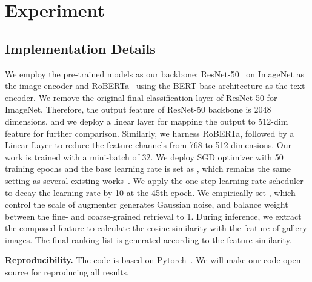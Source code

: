 \documentclass[10pt,twocolumn,letterpaper]{article}
\begin{document}
\section{Experiment}
\subsection{Implementation Details}   
We employ the pre-trained models as our backbone: ResNet-50~\cite{He2015resnet} on ImageNet as the image encoder and RoBERTa~\cite{liu2019roberta} using the BERT-base architecture as the text encoder. 
We remove the original final classification layer of ResNet-50 for ImageNet. Therefore, the output feature of ResNet-50 backbone is 2048 dimensions, and we deploy a linear layer for mapping the output to 512-dim feature for further comparison. Similarly, we harness RoBERTa, followed by a Linear Layer to reduce the feature channels from 768 to 512 dimensions.
Our work is trained with a mini-batch of 32. We deploy SGD optimizer \cite{sgd} with 50 training epochs and the base learning rate is set as , which remains the same setting as several existing works~\cite{2021CoSMo}. 
We apply the one-step learning rate scheduler to decay the learning rate by 10 at the 45th epoch.
We empirically set , which control the scale of augmenter generates Gaussian noise, and balance weight  between the fine- and coarse-grained retrieval to 1. During inference, we extract the composed feature  to calculate the cosine similarity with the feature of gallery images. The final ranking list is generated according to the feature similarity.

\noindent\textbf{Reproducibility.} The code is based on Pytorch~\cite{NEURIPS2019_9015}. We will make our code open-source for reproducing all results.
\end{document}
